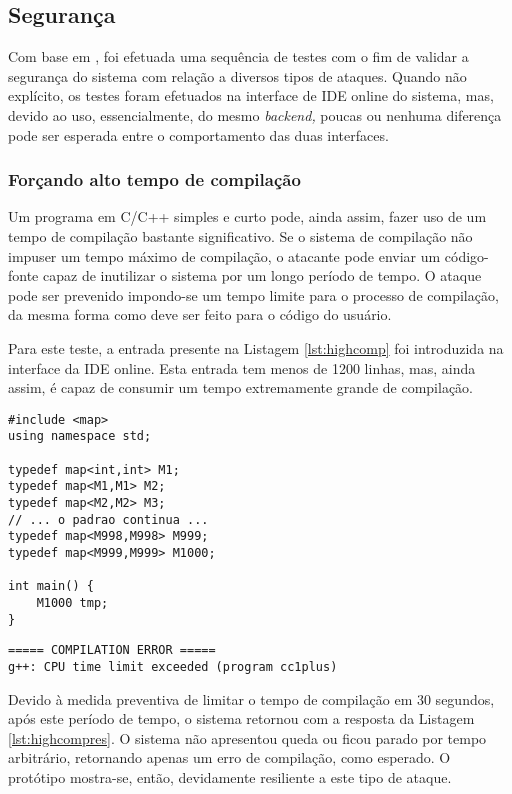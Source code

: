 \documentclass[ruledheader, 12pt]{abnt}
\begin{document}
\subsection{Segurança}

Com base em \cite{forisek2006security}, foi efetuada uma sequência de testes com o fim de validar a segurança do sistema com relação a diversos tipos de ataques. Quando não explícito, os testes foram efetuados na interface de IDE online do sistema, mas, devido ao uso, essencialmente, do mesmo \emph{backend,} poucas ou nenhuma diferença pode ser esperada entre o comportamento das duas interfaces.

\subsubsection{Forçando alto tempo de compilação}

Um programa em C/C++ simples e curto pode, ainda assim, fazer uso de um tempo de compilação bastante significativo. Se o sistema de compilação não impuser um tempo máximo de compilação, o atacante pode enviar um código-fonte capaz de inutilizar o sistema por um longo período de tempo. O ataque pode ser prevenido impondo-se um tempo limite para o processo de compilação, da mesma forma como deve ser feito para o código do usuário.

Para este teste, a entrada presente na Listagem \ref{lst:highcomp} foi introduzida na interface da IDE online. Esta entrada tem menos de 1200 linhas, mas, ainda assim, é capaz de consumir um tempo extremamente grande de compilação.

\begin{lstlisting}[float=bp, label=lst:highcomp, caption=Código C++ com alto tempo de compilação]
#include <map>
using namespace std;

typedef map<int,int> M1;
typedef map<M1,M1> M2;
typedef map<M2,M2> M3;
// ... o padrao continua ...
typedef map<M998,M998> M999;
typedef map<M999,M999> M1000;

int main() {
    M1000 tmp; 
}
\end{lstlisting}

\begin{lstlisting}[float=bp, label=lst:highcompres, caption=Erro proveniente de alto tempo de compilação]
===== COMPILATION ERROR =====
g++: CPU time limit exceeded (program cc1plus)
\end{lstlisting}

Devido à medida preventiva de limitar o tempo de compilação em 30 segundos, após este período de tempo, o sistema retornou com a resposta da Listagem \ref{lst:highcompres}. O sistema não apresentou queda ou ficou parado por tempo arbitrário, retornando apenas um erro de compilação, como esperado. O protótipo mostra-se, então, devidamente resiliente a este tipo de ataque.
\end{document}
